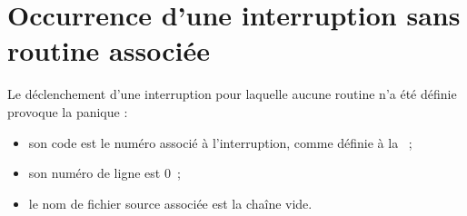\section{Occurrence d'une interruption sans routine associée}

Le déclenchement d'une interruption pour laquelle aucune routine n'a été définie provoque la panique :
\begin{itemize}
  \item son code est le numéro associé à l'interruption, comme définie à la ~;
  \item son numéro de ligne est $0$~;
  \item le nom de fichier source associée est la chaîne vide.
\end{itemize}




%
%
%
%




